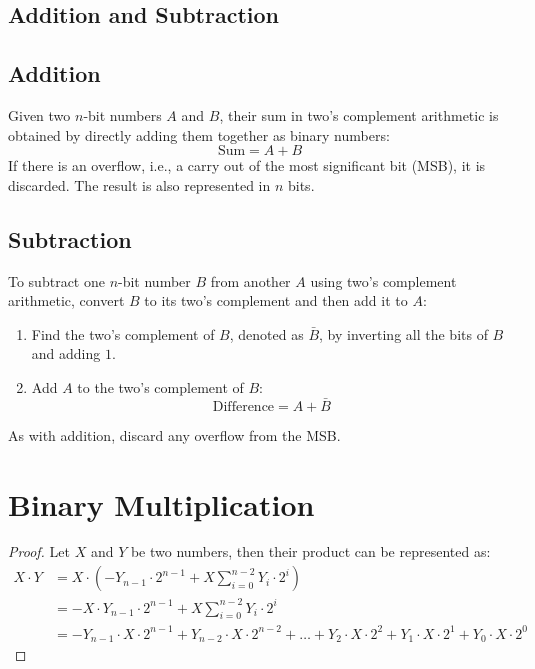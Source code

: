 \documentclass[12pt,openany]{book}
\begin{document}
		\subsection{Addition and Subtraction}
		\subsection{Addition}
		Given two \(n\)-bit numbers \(A\) and \(B\), their sum in two's complement arithmetic is obtained by directly adding them together as binary numbers:
		\begin{equation}
			\text{Sum} = A + B
		\end{equation}
		If there is an overflow, i.e., a carry out of the most significant bit (MSB), it is discarded. The result is also represented in \(n\) bits.
		
		\subsection{Subtraction}
		To subtract one \(n\)-bit number \(B\) from another \(A\) using two's complement arithmetic, convert \(B\) to its two's complement and then add it to \(A\):
		\begin{enumerate}
			\item Find the two's complement of \(B\), denoted as \(\bar{B}\), by inverting all the bits of \(B\) and adding \(1\).
			\item Add \(A\) to the two's complement of \(B\):
			      \begin{equation}
			      	\text{Difference} = A + \bar{B}
			      \end{equation}
		\end{enumerate}
		As with addition, discard any overflow from the MSB.
		
		
		\section{Binary Multiplication}
		
		\begin{proof}[Proof]
			Let $X$ and $Y$ be two numbers, then their product can be represented as:
			\begin{align*}
				X \cdot Y & = X \cdot \left( -Y_{n-1} \cdot 2^{n-1} + X \sum_{i=0}^{n-2} Y_i \cdot 2^i \right)                                                                \\
				          & = -X \cdot Y_{n-1} \cdot 2^{n-1} + X \sum_{i=0}^{n-2} Y_i \cdot 2^i                                                                               \\
				          & = -Y_{n-1} \cdot X \cdot 2^{n-1} + Y_{n-2} \cdot X \cdot 2^{n-2} + \ldots + Y_2 \cdot X \cdot 2^2 + Y_1 \cdot X \cdot 2^1 + Y_0 \cdot X \cdot 2^0 
			\end{align*}
		\end{proof}
		    
\end{document}
